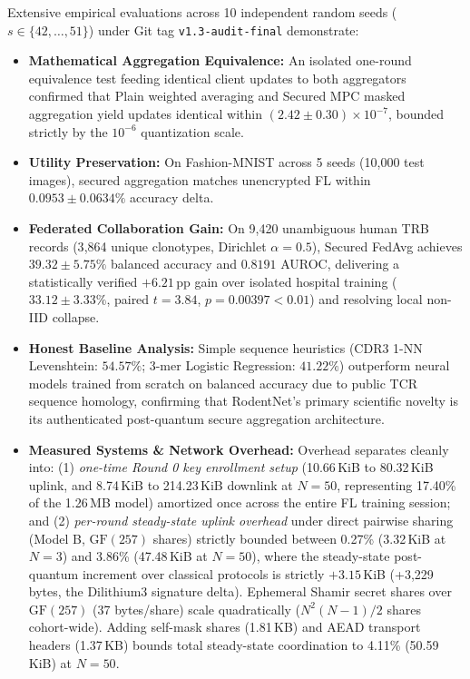 \documentclass[11pt,a4paper]{report}
\begin{document}
Extensive empirical evaluations across 10 independent random seeds ($s \in \{42, \dots, 51\}$) under Git tag \texttt{v1.3-audit-final} demonstrate:
\begin{itemize}[itemsep=2pt]
  \item \textbf{Mathematical Aggregation Equivalence:} An isolated one-round equivalence test feeding identical client updates to both aggregators confirmed that Plain weighted averaging and Secured MPC masked aggregation yield updates identical within $(2.42 \pm 0.30) \times 10^{-7}$, bounded strictly by the $10^{-6}$ quantization scale.
  \item \textbf{Utility Preservation:} On Fashion-MNIST across 5 seeds (10{,}000 test images), secured aggregation matches unencrypted FL within $0.0953 \pm 0.0634\%$ accuracy delta.
  \item \textbf{Federated Collaboration Gain:} On 9{,}420 unambiguous human TRB records (3{,}864 unique clonotypes, Dirichlet $\alpha=0.5$), Secured FedAvg achieves $39.32 \pm 5.75\%$ balanced accuracy and $0.8191$ AUROC, delivering a statistically verified $+6.21$\,pp gain over isolated hospital training ($33.12 \pm 3.33\%$, paired $t = 3.84$, $p = 0.00397 < 0.01$) and resolving local non-IID collapse.
  \item \textbf{Honest Baseline Analysis:} Simple sequence heuristics (CDR3 1-NN Levenshtein: $54.57\%$; 3-mer Logistic Regression: $41.22\%$) outperform neural models trained from scratch on balanced accuracy due to public TCR sequence homology, confirming that RodentNet's primary scientific novelty is its authenticated post-quantum secure aggregation architecture.
  \item \textbf{Measured Systems \& Network Overhead:} Overhead separates cleanly into: (1) \textit{one-time Round 0 key enrollment setup} (10.66\,KiB to 80.32\,KiB uplink, and 8.74\,KiB to 214.23\,KiB downlink at $N=50$, representing 17.40\% of the 1.26\,MB model) amortized once across the entire FL training session; and (2) \textit{per-round steady-state uplink overhead} under direct pairwise sharing (Model B, $\text{GF}(257)$ shares) strictly bounded between 0.27\% (3.32\,KiB at $N=3$) and 3.86\% (47.48\,KiB at $N=50$), where the steady-state post-quantum increment over classical protocols is strictly $+3.15$\,KiB (+3,229 bytes, the Dilithium3 signature delta). Ephemeral Shamir secret shares over $\text{GF}(257)$ (37 bytes/share) scale quadratically ($N^2(N-1)/2$ shares cohort-wide). Adding self-mask shares (1.81\,KB) and AEAD transport headers (1.37\,KB) bounds total steady-state coordination to 4.11\% (50.59\,KiB) at $N=50$.
\end{itemize}
\end{document}

